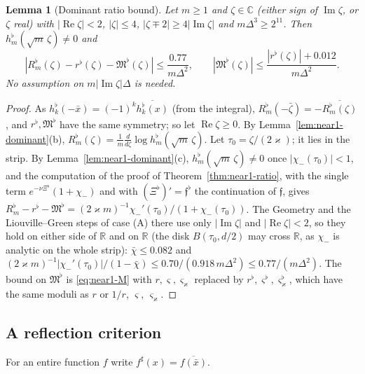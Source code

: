 \documentclass[11pt]{amsart}
\newtheorem{lemma}[theorem]{Lemma}
\theoremstyle{definition}
\theoremstyle{remark}
\numberwithin{equation}{section}
\newcommand{\C}{\mathbb{C}}
\newcommand{\R}{\mathbb{R}}
\DeclareMathOperator{\re}{Re}
\DeclareMathOperator{\im}{Im}
\begin{document}
\begin{lemma}[Dominant ratio bound]\label{lem:near1-domratio}
Let $m\ge1$ and $\zeta\in\C$ (either sign of $\im\zeta$, or $\zeta$ real) with $|\re\zeta|<2$, $|\zeta|\le4$, $|\zeta\mp2|\ge4|\im\zeta|$ and $m\Delta^3\ge2^{11}$. Then $h_m^\flat(\sqrt m\,\zeta)\ne0$ and
\[
|R_m^\flat(\zeta)-r^\flat(\zeta)-\mathfrak M^\flat(\zeta)|\le\frac{0.77}{m\Delta^2},\qquad|\mathfrak M^\flat(\zeta)|\le\frac{|r^\flat(\zeta)|+0.012}{m\Delta^2}.
\]
No assumption on $m|\im\zeta|\Delta$ is needed.
\end{lemma}

\begin{proof}
As $h_k^\flat(-\bar x)=(-1)^k\overline{h_k^\flat(x)}$ (from the integral), $R_m^\flat(-\bar\zeta)=-\overline{R_m^\flat(\zeta)}$, and $r^\flat,\mathfrak M^\flat$ have the same symmetry; so let $\re\zeta\ge0$. By Lemma~\ref{lem:near1-dominant}(b), $R_m^\flat(\zeta)=\frac1m\frac d{d\zeta}\log h_m^\flat(\sqrt m\,\zeta)$. Let $\tau_0=\zeta/(2\varkappa)$; it lies in the strip. By Lemma~\ref{lem:near1-dominant}(c), $h_m^\flat(\sqrt m\,\zeta)\ne0$ once $|\chi_-(\tau_0)|<1$, and the computation of the proof of Theorem~\ref{thm:near1-ratio}, with the single term $e^{-\nu\Xi^\flat}(1+\chi_-)$ and with $(\Xi^\flat)'=\mathfrak f^\flat$ the continuation of $\mathfrak f$, gives $R_m^\flat-r^\flat-\mathfrak M^\flat=(2\varkappa m)^{-1}\chi_-'(\tau_0)/(1+\chi_-(\tau_0))$. The Geometry and the Liouville--Green steps of case (A) there use only $|\im\zeta|$ and $|\re\zeta|<2$, so they hold on either side of $\R$ and on $\R$ (the disk $B(\tau_0,d/2)$ may cross $\R$, as $\chi_-$ is analytic on the whole strip): $\bar\chi\le0.082$ and $(2\varkappa m)^{-1}|\chi_-'(\tau_0)|/(1-\bar\chi)\le0.70/(0.918\,m\Delta^2)\le0.77/(m\Delta^2)$. The bound on $\mathfrak M^\flat$ is \eqref{eq:near1-M} with $r,\varsigma,\varsigma_\varkappa$ replaced by $r^\flat,\varsigma^\flat,\varsigma_\varkappa^\flat$, which have the same moduli as $r$ or $1/r$, $\varsigma$, $\varsigma_\varkappa$.
\end{proof}

\subsection{A reflection criterion}
For an entire function $f$ write $f^\sharp(x)=\overline{f(\bar x)}$.
\end{document}
